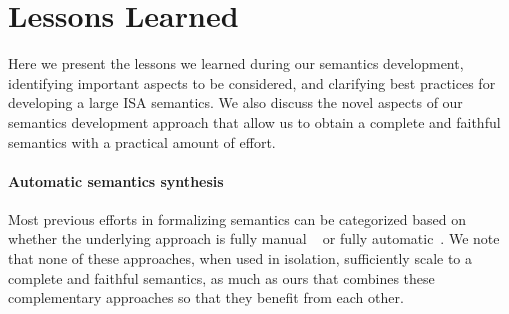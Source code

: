 \section{Lessons Learned}
\label{sec:lesson-learned}
Here we present the lessons we learned during our semantics development,
     identifying important aspects to be considered, and clarifying best
     practices for developing a large ISA semantics.  We also discuss the
     novel aspects of our semantics development approach that allow us to
     obtain a complete and faithful semantics with a practical amount of
     effort.

\paragraph{Automatic semantics synthesis}

Most previous efforts in formalizing \ISA semantics can be categorized based on whether the underlying approach is fully manual ~\cite{Goel:FMCAD14, TSL:TOPLAS13, Leroy:2009, sail-x86} or fully automatic~\cite{Heule2016a, Roessle:CPP19, Hasabnis:ASPLOS16, Hasabnis:FSE16}. We note that none of these approaches, when used in isolation, sufficiently scale to a complete and faithful semantics, as much as ours that combines these complementary approaches so that they benefit from each other.

